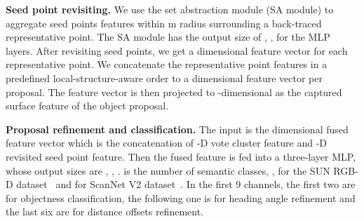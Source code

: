 \documentclass[final]{cvpr}
\begin{document}
\vspace{+1mm}
\noindent\textbf{Seed point revisiting.}
We use the set abstraction module (SA module) to aggregate seed points features within m radius surrounding a back-traced representative point. The SA module has the output size of , ,  for the MLP layers. After revisiting seed points, we get a  dimensional feature vector for each representative point. We concatenate the representative point features in a predefined local-structure-aware order to a  dimensional feature vector per proposal. The feature vector is then projected to -dimensional as the captured surface feature of the object proposal.



\vspace{+1mm}
\noindent\textbf{Proposal refinement and classification.}
The input is the  dimensional fused feature vector which is the concatenation of -D vote cluster feature and -D revisited seed point feature.
Then the fused feature is fed into a  three-layer MLP, whose output sizes are , , .  is the number of semantic classes, \ie,  for the SUN RGB-D dataset~\cite{sunrgb-d} and  for ScanNet V2 dataset~\cite{scannet}.
In the first 9 channels, the first two are for objectness classification, the following one is for heading angle refinement and the last six are for distance offsets refinement.
\end{document}
